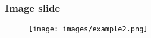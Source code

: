 \begin{frame}
\frametitle{Image slide}

\begin{figure}[htbp]
\begin{center}
\texttt{[image: images/example2.png]}
\end{center}
\end{figure}


\end{frame}


